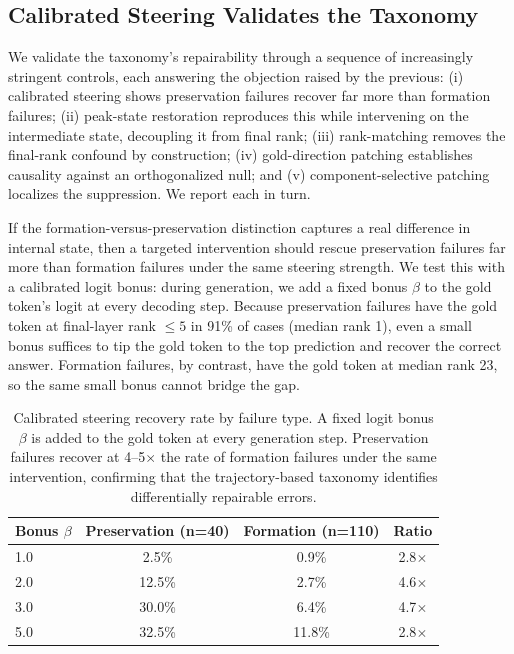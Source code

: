 \documentclass{article} %
\begin{document}
\subsection{Calibrated Steering Validates the Taxonomy}

We validate the taxonomy's repairability through a sequence of increasingly stringent controls, each answering the objection raised by the previous: (i) calibrated steering shows preservation failures recover far more than formation failures; (ii) peak-state restoration reproduces this while intervening on the intermediate state, decoupling it from final rank; (iii) rank-matching removes the final-rank confound by construction; (iv) gold-direction patching establishes causality against an orthogonalized null; and (v) component-selective patching localizes the suppression. We report each in turn.

If the formation-versus-preservation distinction captures a real difference in internal state, then a targeted intervention should rescue preservation failures far more than formation failures under the same steering strength. We test this with a calibrated logit bonus: during generation, we add a fixed bonus $\beta$ to the gold token's logit at every decoding step. Because preservation failures have the gold token at final-layer rank $\le5$ in 91\% of cases (median rank 1), even a small bonus suffices to tip the gold token to the top prediction and recover the correct answer. Formation failures, by contrast, have the gold token at median rank 23, so the same small bonus cannot bridge the gap.

\begin{table}[t]
\centering
\caption{Calibrated steering recovery rate by failure type. A fixed logit bonus $\beta$ is added to the gold token at every generation step. Preservation failures recover at 4--5$\times$ the rate of formation failures under the same intervention, confirming that the trajectory-based taxonomy identifies differentially repairable errors.}
\label{tab:steering}
\begin{tabular}{lccc}
\toprule
\textbf{Bonus $\beta$} & \textbf{Preservation (n=40)} & \textbf{Formation (n=110)} & \textbf{Ratio} \\
\midrule
1.0 & 2.5\% & 0.9\% & 2.8$\times$ \\
2.0 & 12.5\% & 2.7\% & 4.6$\times$ \\
3.0 & 30.0\% & 6.4\% & 4.7$\times$ \\
5.0 & 32.5\% & 11.8\% & 2.8$\times$ \\
\bottomrule
\end{tabular}
\end{table}
\end{document}
